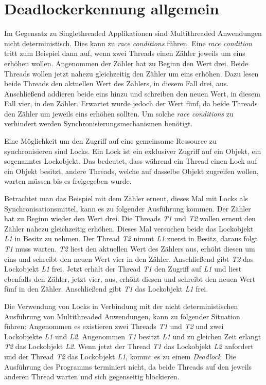 \section{Deadlockerkennung allgemein}
\label{section:Deadlockerkennung allgemein}
Im Gegensatz zu Singlethreaded Applikationen sind Multithreaded Anwendungen
nicht deterministisch. Dies kann zu \textit{race conditions} führen. Eine
\textit{race condition} tritt zum Beispiel dann auf, wenn zwei Threads einen
Zähler jeweils um eins erhöhen wollen. Angenommen der Zähler hat zu Beginn den
Wert drei. Beide Threads wollen jetzt nahezu gleichzeitig den Zähler um eins
erhöhen. Dazu lesen beide Threads den aktuellen Wert des Zählers, in diesem Fall
drei, aus. Anschließend addieren beide eins hinzu und schreiben den neuen Wert,
in diesem Fall vier, in den Zähler. Erwartet wurde jedoch der Wert fünf, da
beide Threads den Zähler um jeweils eins erhöhen sollten. Um solche \textit{race
conditions} zu verhindert werden Synchronisierungsmechanismen benötigt.

Eine Möglichkeit um den Zugriff auf eine gemeinsame Ressource zu synchronisieren
sind Locks. Ein Lock ist ein exklusiver Zugriff auf ein Objekt, ein sogenanntes
Lockobjekt. Das bedeutet, dass während ein Thread einen Lock auf ein Objekt
besitzt, andere Threads, welche auf dasselbe Objekt zugreifen wollen, warten
müssen bis es freigegeben wurde.

Betrachtet man das Beispiel mit dem Zähler erneut, dieses Mal mit Locks als
Synchronisationsmittel, kann es zu folgender Ausführung kommen. Der Zähler hat
zu Beginn wieder den Wert drei. Die Threads \textit{T1} und \textit{T2} wollen
erneut den Zähler nahezu gleichzeitig erhöhen. Dieses Mal versuchen beide das
Lockobjekt \textit{L1} in Besitz zu nehmen. Der Thread \textit{T2} nimmt
\textit{L1} zuerst in Besitz, daraus folgt \textit{T1} muss warten. \textit{T2}
liest den aktuellen Wert des Zählers aus, erhöht diesen um eins und schreibt den
neuen Wert vier in den Zähler. Anschließend gibt \textit{T2} das Lockobjekt
\textit{L1} frei. Jetzt erhält der Thread \textit{T1} den Zugriff auf
\textit{L1} und liest ebenfalls den Zähler, jetzt vier, aus, erhöht diesen und
schreibt den neuen Wert fünf in den Zähler. Anschließend gibt \textit{T1} das
Lockobjekt \textit{L1} frei.

Die Verwendung von Locks in Verbindung mit der nicht deterministischen
Ausführung von Multithreaded Anwendungen, kann zu folgender Situation führen:
Angenommen es existieren zwei Threads \textit{T1} und \textit{T2} und zwei
Lockobjekte \textit{L1} und \textit{L2}. Angenommen \textit{T1} besitzt
\textit{L1} und zu gleichen Zeit erlangt \textit{T2} das Lockobjekt \textit{L2}.
Wenn jetzt der Thread \textit{T1} das Lockobjekt \textit{L2} anfordert und der
Thread \textit{T2} das Lockobjekt \textit{L1}, kommt es zu einem
\textit{Deadlock}. Die Ausführung des Programms terminiert nicht, da beide
Threads auf den jeweils anderen Thread warten und sich gegenseitig blockieren.

